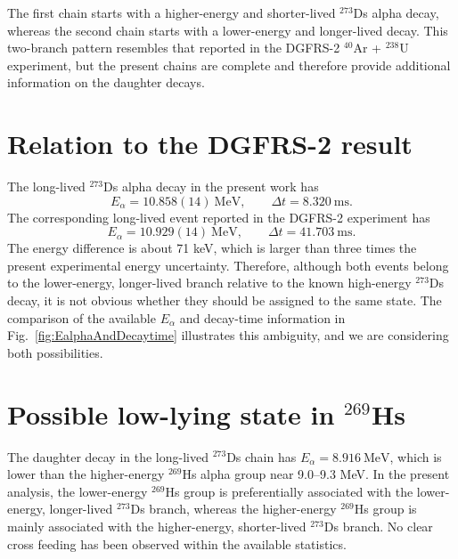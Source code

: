 \documentclass[11pt]{article}
\begin{document}
The first chain starts with a higher-energy and shorter-lived $^{273}$Ds alpha decay, whereas the second chain starts with a lower-energy and longer-lived decay. This two-branch pattern resembles that reported in the DGFRS-2 $^{40}$Ar + $^{238}$U experiment\cite{oganessian2024SynthesisDecayProperties}, but the present chains are complete and therefore provide additional information on the daughter decays.

\section*{Relation to the DGFRS-2 result}

The long-lived $^{273}$Ds alpha decay in the present work has
\[
E_{\alpha}=10.858(14)\ \mathrm{MeV}, \qquad \Delta t=8.320\ \mathrm{ms}.
\]
The corresponding long-lived event reported in the DGFRS-2 experiment \cite{oganessian2024SynthesisDecayProperties} has
\[
E_{\alpha}=10.929(14)\ \mathrm{MeV}, \qquad \Delta t=41.703\ \mathrm{ms}.
\]
The energy difference is about 71 keV, which is larger than three times the present experimental energy uncertainty. Therefore, although both events belong to the lower-energy, longer-lived branch relative to the known high-energy $^{273}$Ds decay, it is not obvious whether they should be assigned to the same state. The comparison of the available $E_{\alpha}$ and decay-time information in Fig.~\ref{fig:EalphaAndDecaytime} illustrates this ambiguity, and we are considering both possibilities.

\section*{Possible low-lying state in $^{269}$Hs}

The daughter decay in the long-lived $^{273}$Ds chain has $E_{\alpha}= 8.916\ \mathrm{MeV}$,
which is lower than the higher-energy $^{269}$Hs alpha group near 9.0--9.3 MeV. In the present analysis, the lower-energy $^{269}$Hs group is preferentially associated with the lower-energy, longer-lived $^{273}$Ds branch, whereas the higher-energy $^{269}$Hs group is mainly associated with the higher-energy, shorter-lived $^{273}$Ds branch. No clear cross feeding has been observed within the available statistics.
\end{document}
